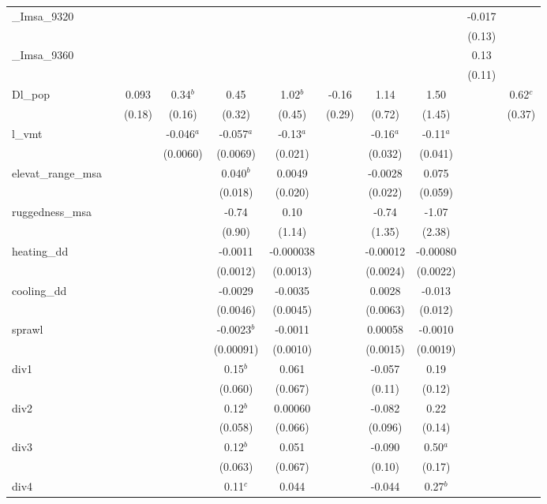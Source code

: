 \documentclass[]{article}
\begin{document}
\begin{tabular}{lcccccccccc}
\_Imsa\_9320 &  &  &  &  &  &  &  &  & -0.017 &  \\
 &  &  &  &  &  &  &  &  & (0.13) &  \\
\_Imsa\_9360 &  &  &  &  &  &  &  &  & 0.13 &  \\
 &  &  &  &  &  &  &  &  & (0.11) &  \\
Dl\_pop &  & 0.093 & 0.34$^b$ & 0.45 & 1.02$^b$ & -0.16 & 1.14 & 1.50 &  & 0.62$^c$ \\
 &  & (0.18) & (0.16) & (0.32) & (0.45) & (0.29) & (0.72) & (1.45) &  & (0.37) \\
l\_vmt &  &  & -0.046$^a$ & -0.057$^a$ & -0.13$^a$ &  & -0.16$^a$ & -0.11$^a$ &  &  \\
 &  &  & (0.0060) & (0.0069) & (0.021) &  & (0.032) & (0.041) &  &  \\
elevat\_range\_msa &  &  &  & 0.040$^b$ & 0.0049 &  & -0.0028 & 0.075 &  &  \\
 &  &  &  & (0.018) & (0.020) &  & (0.022) & (0.059) &  &  \\
ruggedness\_msa &  &  &  & -0.74 & 0.10 &  & -0.74 & -1.07 &  &  \\
 &  &  &  & (0.90) & (1.14) &  & (1.35) & (2.38) &  &  \\
heating\_dd &  &  &  & -0.0011 & -0.000038 &  & -0.00012 & -0.00080 &  &  \\
 &  &  &  & (0.0012) & (0.0013) &  & (0.0024) & (0.0022) &  &  \\
cooling\_dd &  &  &  & -0.0029 & -0.0035 &  & 0.0028 & -0.013 &  &  \\
 &  &  &  & (0.0046) & (0.0045) &  & (0.0063) & (0.012) &  &  \\
sprawl &  &  &  & -0.0023$^b$ & -0.0011 &  & 0.00058 & -0.0010 &  &  \\
 &  &  &  & (0.00091) & (0.0010) &  & (0.0015) & (0.0019) &  &  \\
div1 &  &  &  & 0.15$^b$ & 0.061 &  & -0.057 & 0.19 &  &  \\
 &  &  &  & (0.060) & (0.067) &  & (0.11) & (0.12) &  &  \\
div2 &  &  &  & 0.12$^b$ & 0.00060 &  & -0.082 & 0.22 &  &  \\
 &  &  &  & (0.058) & (0.066) &  & (0.096) & (0.14) &  &  \\
div3 &  &  &  & 0.12$^b$ & 0.051 &  & -0.090 & 0.50$^a$ &  &  \\
 &  &  &  & (0.063) & (0.067) &  & (0.10) & (0.17) &  &  \\
div4 &  &  &  & 0.11$^c$ & 0.044 &  & -0.044 & 0.27$^b$ &  &  \\

\end{tabular}
\end{document}
